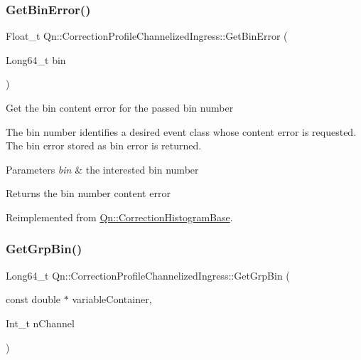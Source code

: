 \subsubsection{\texorpdfstring{Get\+Bin\+Error()}{GetBinError()}}
{\footnotesize\ttfamily Float\+\_\+t Qn\+::\+Correction\+Profile\+Channelized\+Ingress\+::\+Get\+Bin\+Error (\begin{DoxyParamCaption}\item[{Long64\+\_\+t}]{bin }\end{DoxyParamCaption})\hspace{0.3cm}{\ttfamily [virtual]}}

Get the bin content error for the passed bin number

The bin number identifies a desired event class whose content error is requested. The bin error stored as bin error is returned.


\begin{DoxyParams}{Parameters}
{\em bin} & the interested bin number \\
\hline
\end{DoxyParams}
\begin{DoxyReturn}{Returns}
the bin number content error 
\end{DoxyReturn}


Reimplemented from \mbox{\hyperlink{classQn_1_1CorrectionHistogramBase_a50a7dd4c5bbe5e4d0e405365c2a9104d}{Qn\+::\+Correction\+Histogram\+Base}}.

\mbox{\label{classQn_1_1CorrectionProfileChannelizedIngress_aa28e227c6ba5d7c8ecc03b9c4180a523}} 
\subsubsection{\texorpdfstring{Get\+Grp\+Bin()}{GetGrpBin()}}
{\footnotesize\ttfamily Long64\+\_\+t Qn\+::\+Correction\+Profile\+Channelized\+Ingress\+::\+Get\+Grp\+Bin (\begin{DoxyParamCaption}\item[{const double $\ast$}]{variable\+Container,  }\item[{Int\+\_\+t}]{n\+Channel }\end{DoxyParamCaption})\hspace{0.3cm}{\ttfamily [virtual]}}

